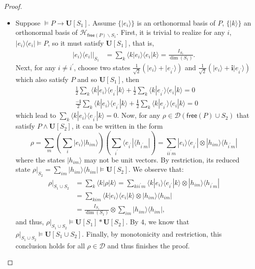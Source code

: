 \documentclass[conference,compsoc, 10pt]{IEEEtran}
\newcommand {\cD } {{\mathcal{D}}}
\newcommand {\cH } {{\mathcal{H}}}
\newcommand {\bi } {{\boldsymbol{i}}}
\newcommand {\free }[1] {{\mathsf{free}\left(#1\right)}}
\newcommand {\rt }[2] {{\left.{#1}\right|_{#2}}}
\newcommand {\unia } {{\mathbf{U}}}
\def\>{\ensuremath{\rangle}}
\def\<{\ensuremath{\langle}}
\begin{document}
\begin{appendices}
\begin{proof}
\begin{itemize}
				\item Suppose $\models P\rightarrow\unia[S_1]$. Assume $\{|e_i\>\}$ is an orthonormal basis of $P$, $\{|k\>\}$ an orthonormal basis of $\cH_{\free{P}\backslash S_1}$. First, it is trivial to realize for any $i$, $|e_i\>\<e_i|\models P$, so it must satisfy $\unia[S_1]$, that is,
				\begin{align*}
				\rt{|e_i\>\<e_i|}{S_1} &= \sum_k\<k|e_i\>\<e_i|k\> = \frac{I_{S_1}}{\dim(S_1)}.
				\end{align*}
				Next, for any $i\neq i^\prime$, choose two states $\frac{1}{\sqrt{2}}(|e_i\>+|e_{i^\prime}\>)$ and $\frac{1}{\sqrt{2}}(|e_i\>+\bi|e_{i^\prime}\>)$ which also satisfy $P$ and so $\unia[S_1]$, then 
				\begin{align*}
				&\frac{1}{2}\sum_k\<k|e_i\>\<e_{i^\prime}|k\> + \frac{1}{2}\sum_k\<k|e_{i^\prime}\>\<e_i|k\> = 0 \\
				&\frac{-\bi}{2}\sum_k\<k|e_i\>\<e_{i^\prime}|k\> + \frac{\bi}{2}\sum_k\<k|e_{i^\prime}\>\<e_i|k\> = 0
				\end{align*}
				which lead to $\sum_k\<k|e_i\>\<e_{i^\prime}|k\> = 0$. Now, for any $\rho\in\cD(\free{P}\cup S_2)$ that satisfy $P\wedge\unia[S_2]$, it can be written in the form
				$$\rho = \sum_m\left(\sum_i|e_i\>|h_{im}\>\right)\left(\sum_{i^\prime}\<e_{i^\prime}|\<h_{i^\prime m}|\right) = \sum_{ii^\prime m}|e_i\>\<e_{i^\prime}|\otimes|h_{im}\>\<h_{i^\prime m}|$$
				where the states $|h_{im}\>$ may not be unit vectors. By restriction, its reduced state $\rt{\rho}{S_2} = \sum_{im}|h_{im}\>\<h_{im}|\models \unia[S_2]$.
				We observe that:
				\begin{align*}
				\rt{\rho}{S_1\cup S_2} &= \sum_k\<k|\rho|k\> = \sum_{kii^\prime m}\<k|e_i\>\<e_{i^\prime}|k\>\otimes|h_{im}\>\<h_{i^\prime m}| \\
				&= \sum_{kim}\<k|e_i\>\<e_{i}|k\>\otimes|h_{im}\>\<h_{im}|  \\
				&= \frac{I_{S_1}}{\dim(S_1)}\otimes\sum_{im}|h_{im}\>\<h_{im}|, 
				\end{align*}
				and thus, $\rt{\rho}{S_1\cup S_2}\models \unia[S_1]\ast\unia[S_2]$. By $\mathit{4}$, we know that 
				$\rt{\rho}{S_1\cup S_2}\models \unia[S_1\cup S_2]$. Finally, by monotonicity and restriction, this conclusion holds for all $\rho\in\cD$ and thus finishes the proof.
				
			\end{itemize}
			
		\end{proof}
		

\end{appendices}
\end{document}
